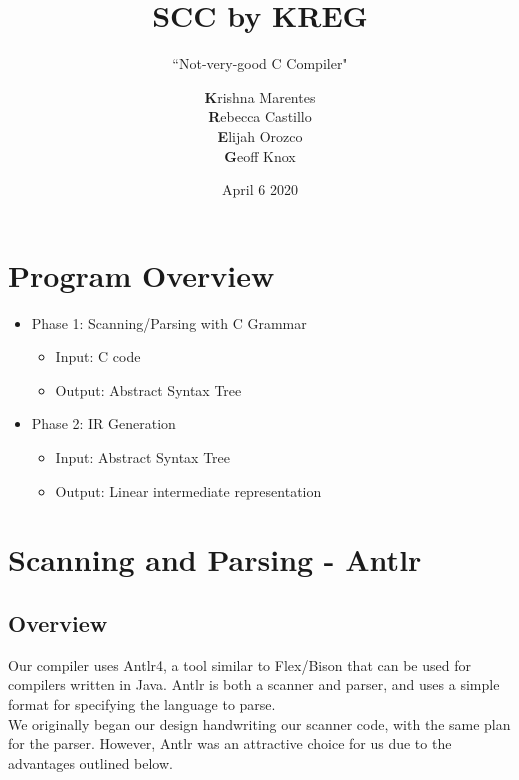 \documentclass{scrartcl}
\title{SCC by KREG}
\subtitle{``Not-very-good C Compiler"}
\author{\textbf{K}rishna Marentes\\\textbf{R}ebecca Castillo\\\textbf{E}lijah Orozco\\\textbf{G}eoff Knox}
\date{April 6 2020}
\begin{document}
\maketitle
\tableofcontents

\section{Program Overview}
\begin{itemize}
    \item Phase 1: Scanning/Parsing with C Grammar
    \begin{itemize}
        \item Input: C code
        \item Output: Abstract Syntax Tree
    \end{itemize}
    \item Phase 2: IR Generation
    \begin{itemize}
        \item Input: Abstract Syntax Tree
        \item Output: Linear intermediate representation
    \end{itemize}
\end{itemize}

\section{Scanning and Parsing - Antlr}
\subsection{Overview}
Our compiler uses Antlr4, a tool similar to Flex/Bison that can be used for compilers written in Java. Antlr is both a scanner and parser, and uses a simple format for specifying the language to parse.\\
We originally began our design handwriting our scanner code, with the same plan for the parser. However, Antlr was an attractive choice for us due to the advantages outlined below.
\end{document}
